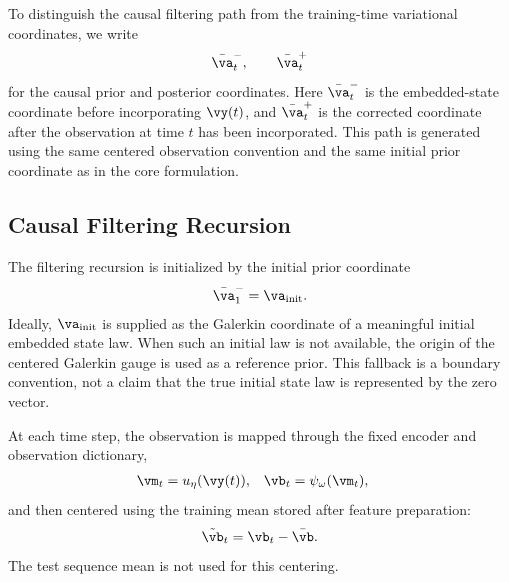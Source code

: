 \documentclass[twoside,11pt]{article}
\begin{document}
To distinguish the causal filtering path from the training-time
variational coordinates, we write
\begin{align}
\bar{\va}_t^-,
\qquad
\bar{\va}_t^+
\end{align}
for the causal prior and posterior coordinates. Here
$\bar{\va}_t^-$ is the embedded-state coordinate before incorporating
$\vy(t)$, and $\bar{\va}_t^+$ is the corrected coordinate after the
observation at time $t$ has been incorporated. This path is generated
using the same centered observation convention and the same initial
prior coordinate as in the core formulation.

\subsection{Causal Filtering Recursion}

The filtering recursion is initialized by the initial prior coordinate
\begin{align}
\bar{\va}_1^-
=
\va_{\mathrm{init}}.
\label{eq:test_initial_prior_coordinate}
\end{align}
Ideally, $\va_{\mathrm{init}}$ is supplied as the Galerkin coordinate of
a meaningful initial embedded state law. When such an initial law is not
available, the origin of the centered Galerkin gauge is used as a
reference prior. This fallback is a boundary convention, not a claim
that the true initial state law is represented by the zero vector.

At each time step, the observation is mapped through the fixed encoder
and observation dictionary,
\begin{align}
\vm_t
&=
u_\eta(\vy(t)),
&
\vb_t
&=
\psi_\omega(\vm_t),
\label{eq:test_observation_feature}
\end{align}
and then centered using the training mean stored after feature
preparation:
\begin{align}
\tilde{\vb}_t
=
\vb_t-\bar{\vb}.
\label{eq:test_centered_observation_feature}
\end{align}
The test sequence mean is not used for this centering.
\end{document}

